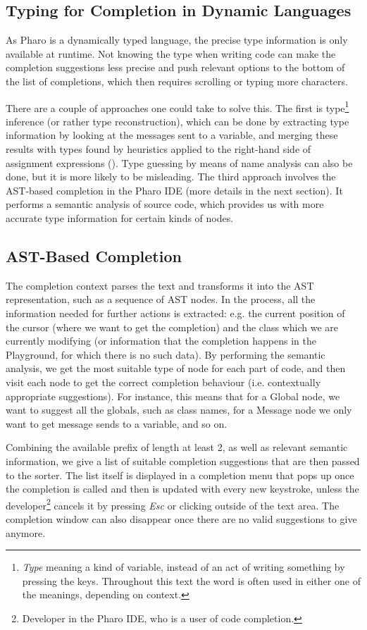 \documentclass[sigplan,screen]{acmart}
\begin{document}
\subsection{Typing for Completion in Dynamic Languages}
As Pharo is a dynamically typed language, the precise type information is only available at runtime. Not knowing the type when writing code can make the completion suggestions less precise and push relevant options to the bottom of the list of completions, which then requires scrolling or typing more characters.

There are a couple of approaches one could take to solve this. The first is type\footnote{\textit{Type} meaning a kind of variable, instead of an act of writing something by pressing the keys. Throughout this text the word is often used in either one of the meanings, depending on context.} inference (or rather type reconstruction), which can be done by extracting type information by looking at the messages sent to a variable, and merging these results with types found by heuristics applied to the right-hand side of assignment expressions (\cite{Pluq09a}). Type guessing by means of name analysis can also be done, but it is more likely to be misleading. The third approach involves the AST-based completion in the Pharo IDE (more details in the next section). It performs a semantic analysis of source code, which provides us with more accurate type information for certain kinds of nodes.

\subsection{AST-Based Completion}
The completion context parses the text and transforms it into the AST representation, such as a sequence of AST nodes. In the process, all the information needed for further actions is extracted: e.g. the current position of the cursor (where we want to get the completion) and the class which we are currently modifying (or information that the completion happens in the Playground, for which there is no such data). By performing the semantic analysis, we get the most suitable type of node for each part of code, and then visit each node to get the correct completion behaviour (i.e. contextually appropriate suggestions). For instance, this means that for a Global node, we want to suggest all the globals, such as class names, for a Message node we only want to get message sends to a variable, and so on.

Combining the available prefix of length at least 2, as well as relevant semantic information, we give a list of suitable completion suggestions that are then passed to the sorter. The list itself is displayed in a completion menu that pops up once the completion is called and then is updated with every new keystroke, unless the developer\footnote{Developer in the Pharo IDE, who is a user of code completion.} cancels it by pressing \textit{Esc} or clicking outside of the text area. The completion window can also disappear once there are no valid suggestions to give anymore.
\end{document}
